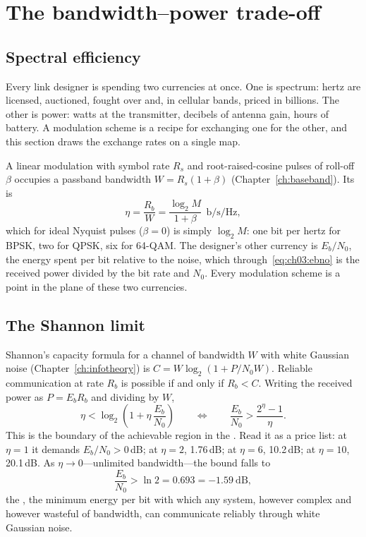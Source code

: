 \section{The bandwidth--power trade-off}
\label{sec:ch09:tradeoff}

\subsection{Spectral efficiency}

Every link designer is spending two currencies at once. One is spectrum: hertz are licensed,
auctioned, fought over and, in cellular bands, priced in billions. The other is power: watts at
the transmitter, decibels of antenna gain, hours of battery. A modulation scheme is a recipe for
exchanging one for the other, and this section draws the exchange rates on a single map.

A linear modulation with symbol rate $R_s$ and root-raised-cosine pulses of roll-off $\beta$
occupies a passband bandwidth $W=R_s(1+\beta)$ (Chapter~\ref{ch:baseband}). Its
 is
\begin{equation}
\eta=\frac{R_b}{W}=\frac{\log_2M}{1+\beta}\ \ \text{b/s/Hz},
\label{eq:ch09:eta}
\end{equation}
which for ideal Nyquist pulses ($\beta=0$) is simply $\log_2M$: one bit per hertz for BPSK, two
for QPSK, six for 64-QAM. The designer's other currency is $E_b/N_0$, the energy spent per bit
relative to the noise, which through~\eqref{eq:ch03:ebno} is the received power divided by the
bit rate and $N_0$. Every modulation scheme is a point in the plane of these two currencies.

\subsection{The Shannon limit}

Shannon's capacity formula for a channel of bandwidth $W$ with white Gaussian noise
(Chapter~\ref{ch:infotheory}) is $C=W\log_2(1+P/N_0W)$. Reliable communication at rate $R_b$ is
possible if and only if $R_b<C$. Writing the received power as $P=E_bR_b$ and dividing by $W$,
\begin{equation}
\eta<\log_2\!\left(1+\eta\,\frac{E_b}{N_0}\right)
\qquad\Longleftrightarrow\qquad
\frac{E_b}{N_0}>\frac{2^\eta-1}{\eta}.
\label{eq:ch09:shannon}
\end{equation}
This is the boundary of the achievable region in the . Read it as a
price list: at $\eta=1$ it demands $E_b/N_0>0$\,dB; at $\eta=2$, 1.76\,dB; at $\eta=6$, 10.2\,dB; at
$\eta=10$, 20.1\,dB. As $\eta\to0$---unlimited bandwidth---the bound falls to
\begin{equation}
\frac{E_b}{N_0}>\ln2=0.693=-1.59\ \text{dB},
\label{eq:ch09:ln2}
\end{equation}
the , the minimum energy per bit with which any system, however complex and
however wasteful of bandwidth, can communicate reliably through white Gaussian noise.

